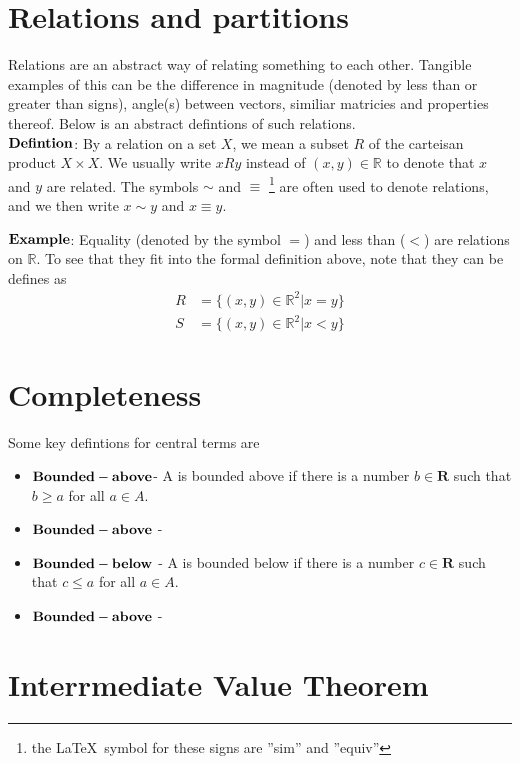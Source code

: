 \documentclass[12pt,letterpaper]{article}
\begin{document}
\section*{Relations and partitions}
Relations are an abstract way of relating something to each other. Tangible examples of this can be the difference in magnitude (denoted by less than or greater than signs), angle(s) between vectors, similiar matricies and properties thereof. Below is an abstract defintions of such relations. \\

\noindent
$\bold{Defintion}$: By a relation on a set $X$, we mean a subset $R$ of the carteisan product $X \times X$. We usually write $xRy$ instead of $(x,y) \in \mathbb{R}$ to denote that $x$ and $y$ are related. The symbols $\sim$ and $\equiv$  \footnote{the \LaTeX\  symbol for these signs are ''sim'' and ''equiv''} are often used to denote relations, and we then write $x\sim y$ and $x \equiv y$.

$\bold{Example}$: Equality (denoted by the symbol $=$) and less than ($<$)  are relations on $\mathbb{R}$. To see that they fit into the formal definition above, note that they can be defines as 
\begin{align*}
	R &= \{(x,y) \in \mathbb{R}^2 | x = y\} \\
	S &= \{(x,y) \in \mathbb{R}^2 | x < y\} 
\end{align*}


\section*{Completeness}
Some key defintions for central terms are 
\begin{itemize}
	\item $\bold{Bounded-above}$- A is bounded above if there is a number $b\in\mathbf{R}$ such that $b\ge a$ for all $a\in A$.
	\item $\bold{Bounded-above}$ - 
	\item $\bold{Bounded-below}$ - A is bounded below if there is a number $c\in\mathbf{R}$ such that $c\le a$ for all $a\in A$.
	\item $\bold{Bounded-above}$ - 
\end{itemize}




\section*{Interrmediate Value Theorem}
\end{document}
